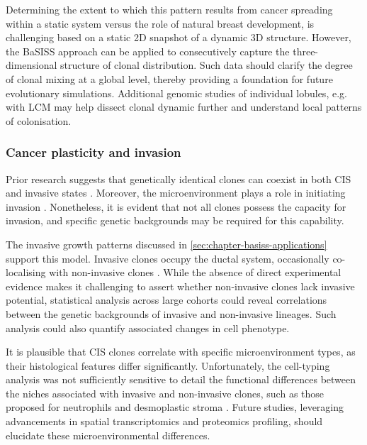 Determining the extent to which this pattern results from cancer spreading within a static system versus the role of natural breast development, is challenging based on a static 2D snapshot of a dynamic 3D structure. However, the \ac{BaSISS} approach can be applied to consecutively capture the three-dimensional structure of clonal distribution. Such data should clarify the degree of clonal mixing at a global level, thereby providing a foundation for future evolutionary simulations. Additional genomic studies of individual lobules, e.g. with \ac{LCM} may help dissect clonal dynamic further and understand local patterns of colonisation. 

\subsubsection*{Cancer plasticity and invasion}

Prior research suggests that genetically identical clones can coexist in both \acl{CIS} and invasive states \parencite{Casasent2018-gx}. Moreover, the microenvironment plays a role in initiating invasion \parencite{Sinha2021-mf,Risom2022-uw} . Nonetheless, it is evident that not all clones possess the capacity for invasion, and specific genetic backgrounds may be required for this capability.

The invasive growth patterns discussed in \cref{sec:chapter-basiss-applications} support this model. Invasive clones occupy the ductal system, occasionally co-localising with non-invasive clones . While the absence of direct experimental evidence makes it challenging to assert whether non-invasive clones lack invasive potential, statistical analysis across large cohorts could reveal correlations between the genetic backgrounds of invasive and non-invasive lineages. Such analysis could also quantify associated changes in cell phenotype.

It is plausible that \ac{CIS} clones correlate with specific microenvironment types, as their histological features differ significantly. Unfortunately, the cell-typing analysis was not sufficiently sensitive to detail the functional differences between the niches associated with invasive and non-invasive clones, such as those proposed for neutrophils \parencite{Sinha2021-mf} and desmoplastic stroma \parencite{Risom2022-uw}. Future studies, leveraging advancements in spatial transcriptomics and proteomics profiling, should elucidate these microenvironmental differences.

